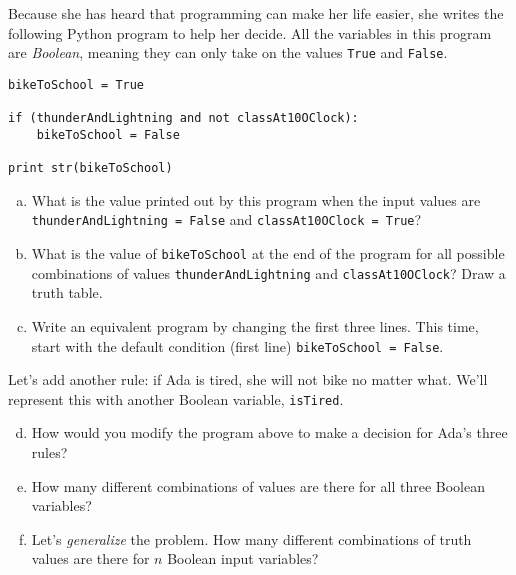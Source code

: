 \documentclass{article}
\begin{document}
Because she has heard that programming can make her life easier,
she writes the following Python program to help her decide. All
the variables in this program are \emph{Boolean}, meaning they can
only take on the values \texttt{True} and \texttt{False}.

\begin{lstlisting}
bikeToSchool = True

if (thunderAndLightning and not classAt10OClock):
	bikeToSchool = False
	
print str(bikeToSchool)
\end{lstlisting}

\begin{enumerate}[(a)]
\item
What is the value printed out by this program when the
input values are \texttt{thunderAndLightning = False}
and \texttt{classAt10OClock = True}?
\item
What is the value of \texttt{bikeToSchool} at the end of the
program for all
possible combinations of values \texttt{thunderAndLightning} and
\texttt{classAt10OClock}? Draw a truth table.
\item
Write an equivalent program by changing the first three lines.
This time, start with the default condition (first line)
\texttt{bikeToSchool = False}.
\end{enumerate}

Let's add another rule: if Ada is tired, she will not bike no
matter what. We'll represent this with another Boolean variable,
\texttt{isTired}.

\begin{enumerate}[(a)]
\setcounter{enumi}{3}
\item
How would you modify the program above to
make a decision for Ada's three rules?
\item
How many different combinations
of values are there for all three Boolean variables?
\item
Let's \emph{generalize} the problem.
How many different combinations of truth values are
there for $n$ Boolean input variables?
\end{enumerate}
\end{document}
